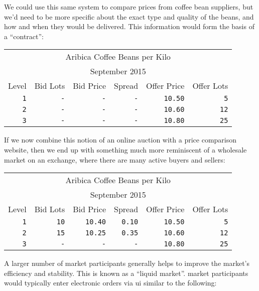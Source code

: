 \documentclass[11pt,a4paper]{article}
\begin{document}
We could use this same system to compare prices from coffee bean suppliers, but we'd need to be more
specific about the exact type and quality of the beans, and how and when they would be
delivered. This information would form the basis of a ``\gls{contract}'':

\vspace{5mm}
\begin{tabular}{r|rrrrr}
\multicolumn{6}{c}{Aribica Coffee Beans per Kilo}\\
\multicolumn{6}{c}{September 2015}\\
Level&Bid Lots&Bid Price&Spread&Offer Price&Offer Lots\\
\hline
\texttt{1}&\texttt{-}&\texttt{-}&\texttt{-}&\texttt{10.50}&\texttt{5}\\
\texttt{2}&\texttt{-}&\texttt{-}&\texttt{-}&\texttt{10.60}&\texttt{12}\\
\texttt{3}&\texttt{-}&\texttt{-}&\texttt{-}&\texttt{10.80}&\texttt{25}\\
\end{tabular}
\vspace{5mm}

If we now combine this notion of an online \gls{auction} with a price comparison website, then we
end up with something much more reminiscent of a wholesale \gls{market} on an \gls{exchange}, where
there are many active buyers and sellers:

\vspace{5mm}
\begin{tabular}{r|rrrrr}
\multicolumn{6}{c}{Aribica Coffee Beans per Kilo}\\
\multicolumn{6}{c}{September 2015}\\
Level&Bid Lots&Bid Price&Spread&Offer Price&Offer Lots\\
\hline
\texttt{1}&\texttt{10}&\texttt{10.40}&\texttt{0.10}&\texttt{10.50}&\texttt{5}\\
\texttt{2}&\texttt{15}&\texttt{10.25}&\texttt{0.35}&\texttt{10.60}&\texttt{12}\\
\texttt{3}&\texttt{-}&\texttt{-}&\texttt{-}&\texttt{10.80}&\texttt{25}\\
\end{tabular}
\vspace{5mm}

A larger number of \gls{market} participants generally helps to improve the \gls{market}'s
efficiency and stability. This is known as a ``\gls{liquid market}''. \Gls{market} participants
would typically enter electronic \glspl{order} via \gls{ui} similar to the following:
\end{document}
